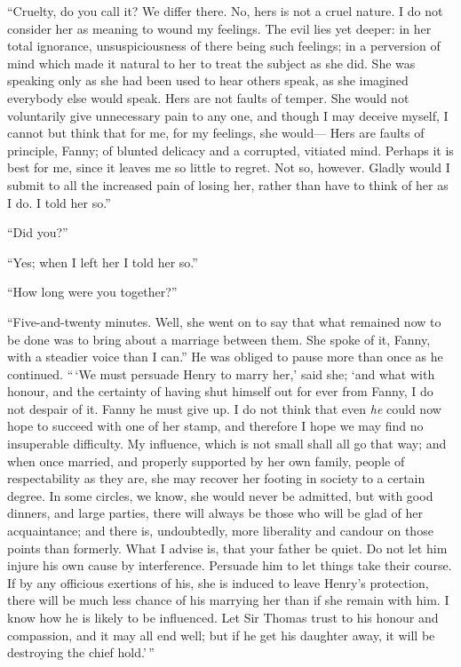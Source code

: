 \documentclass{article}
\begin{document}
``Cruelty, do you call it?  We differ there.  No, hers is
not a cruel nature.  I do not consider her as meaning
to wound my feelings.  The evil lies yet deeper:
in her total ignorance, unsuspiciousness of there being
such feelings; in a perversion of mind which made it
natural to her to treat the subject as she did.  She was
speaking only as she had been used to hear others speak,
as she imagined everybody else would speak.  Hers are
not faults of temper.  She would not voluntarily give
unnecessary pain to any one, and though I may deceive myself,
I cannot but think that for me, for my feelings, she would---%
Hers are faults of principle, Fanny; of blunted delicacy
and a corrupted, vitiated mind.  Perhaps it is best for me,
since it leaves me so little to regret.  Not so, however.
Gladly would I submit to all the increased pain of
losing her, rather than have to think of her as I do.
I told her so.''

``Did you?''

``Yes; when I left her I told her so.''

``How long were you together?''

``Five-and-twenty minutes.  Well, she went on to say that
what remained now to be done was to bring about a marriage
between them.  She spoke of it, Fanny, with a steadier
voice than I can.''  He was obliged to pause more than once
as he continued.  ``\,`We must persuade Henry to marry her,'
said she; `and what with honour, and the certainty of having
shut himself out for ever from Fanny, I do not despair
of it.  Fanny he must give up.  I do not think that even
\emph{he} could now hope to succeed with one of her stamp,
and therefore I hope we may find no insuperable difficulty.
My influence, which is not small shall all go that way;
and when once married, and properly supported by her
own family, people of respectability as they are, she may
recover her footing in society to a certain degree.
In some circles, we know, she would never be admitted,
but with good dinners, and large parties, there will
always be those who will be glad of her acquaintance;
and there is, undoubtedly, more liberality and candour
on those points than formerly.  What I advise is,
that your father be quiet.  Do not let him injure his own
cause by interference.  Persuade him to let things take
their course.  If by any officious exertions of his,
she is induced to leave Henry's protection, there will be
much less chance of his marrying her than if she remain
with him.  I know how he is likely to be influenced.
Let Sir Thomas trust to his honour and compassion, and it
may all end well; but if he get his daughter away, it will
be destroying the chief hold.'\,''
\end{document}
